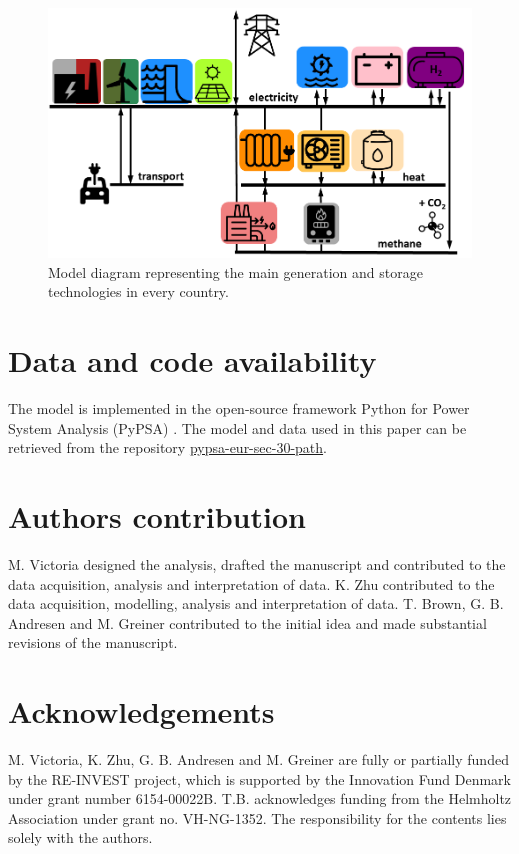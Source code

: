\documentclass[5p]{elsarticle} %
\begin{document}
\begin{figure}[!h]
\centering
\includegraphics[width=\columnwidth]{../figures/model.png}
\caption{Model diagram representing the main generation and storage technologies in every country.} \label{fig_model} 
\end{figure}

\section{Data and code availability}

The model is implemented in the open-source framework Python for Power System Analysis (PyPSA) \cite{PyPSA}. The model and data used in this paper can be retrieved from the repository \href{https://github.com/martavp/pypsa-eur-sec-30-path}{pypsa-eur-sec-30-path}.

\section{Authors contribution}

M. Victoria designed the analysis, drafted the manuscript and contributed to the data acquisition, analysis and interpretation of data. K. Zhu contributed to the data acquisition, modelling, analysis and interpretation of data. 
T. Brown, G. B. Andresen and M. Greiner contributed to the initial idea and made substantial revisions of the manuscript. 

\section{Acknowledgements}
M. Victoria, K. Zhu, G. B. Andresen and M. Greiner are fully or partially funded by the RE-INVEST project, which is supported by  the  Innovation  Fund  Denmark  under  grant  number  6154-00022B. T.B. acknowledges funding from the Helmholtz Association under grant no. VH-NG-1352. The responsibility for the contents lies solely with the authors.


\end{document}
